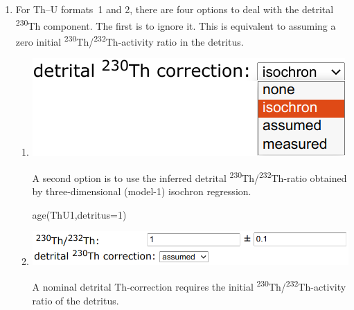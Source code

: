 \begin{refsection}
\begin{enumerate}

\item For Th--U formats~1 and 2, there are four options to deal with
  the detrital \textsuperscript{230}Th component. The first is to
  ignore it. This is equivalent to assuming a zero initial
  \textsuperscript{230}Th/\textsuperscript{232}Th-activity ratio in
  the detritus.

  \begin{enumerate}
  
  \item \begin{minipage}[t]{.4\linewidth}
    \strut\vspace*{-\baselineskip}\newline
    \includegraphics[width=\linewidth]{../figures/ThUdetritalisochroncorr.png}
  \end{minipage}
    \begin{minipage}[t]{.6\linewidth}
      A second option is to use the inferred detrital
      \textsuperscript{230}Th/\textsuperscript{232}Th-ratio obtained
      by three-dimensional (model-1) isochron regression.
    \end{minipage}

\begin{console}
age(ThU1,detritus=1)
\end{console}

\item \begin{minipage}[t]{.7\linewidth}
    \strut\vspace*{-\baselineskip}\newline
    \includegraphics[width=\linewidth]{../figures/ThUinitialThassumed.png}
  \end{minipage}
    \begin{minipage}[t]{.3\linewidth}
      A nominal detrital Th-correction requires the initial
      \textsuperscript{230}Th/\textsuperscript{232}Th-activity ratio
      of the detritus.\\
    \end{minipage}


\end{enumerate}
\end{enumerate}
\end{refsection}
